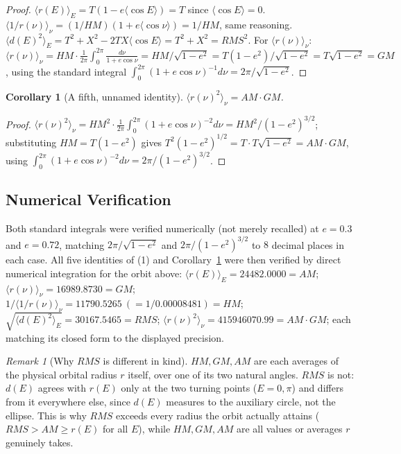 \documentclass[12pt]{amsart}
\theoremstyle{plain}
\newtheorem{corollary}[theorem]{Corollary}
\theoremstyle{remark}
\newtheorem*{remark}{Remark}
\begin{document}
\begin{proof}
$\langle r(E)\rangle_E=T(1-e\langle\cos E\rangle)=T$ since $\langle\cos E\rangle=0$. $\langle 1/r(\nu)\rangle_\nu=(1/HM)(1+e\langle\cos\nu\rangle)=1/HM$, same reasoning. $\langle d(E)^2\rangle_E=T^2+X^2-2TX\langle\cos E\rangle=T^2+X^2=RMS^2$. For $\langle r(\nu)\rangle_\nu$: $\langle r(\nu)\rangle_\nu=HM\cdot\tfrac1{2\pi}\int_0^{2\pi}\tfrac{d\nu}{1+e\cos\nu}=HM/\sqrt{1-e^2}=T(1-e^2)/\sqrt{1-e^2}=T\sqrt{1-e^2}=GM$, using the standard integral $\int_0^{2\pi}(1+e\cos\nu)^{-1}d\nu=2\pi/\sqrt{1-e^2}$.
\end{proof}

\begin{corollary}[A fifth, unnamed identity]\label{cor:AMGM}
$\langle r(\nu)^2\rangle_\nu=AM\cdot GM$.
\end{corollary}

\begin{proof}
$\langle r(\nu)^2\rangle_\nu=HM^2\cdot\tfrac1{2\pi}\int_0^{2\pi}(1+e\cos\nu)^{-2}d\nu=HM^2/(1-e^2)^{3/2}$; substituting $HM=T(1-e^2)$ gives $T^2(1-e^2)^{1/2}=T\cdot T\sqrt{1-e^2}=AM\cdot GM$, using $\int_0^{2\pi}(1+e\cos\nu)^{-2}d\nu=2\pi/(1-e^2)^{3/2}$.
\end{proof}

\subsection*{Numerical Verification}
Both standard integrals were verified numerically (not merely recalled) at $e=0.3$ and $e=0.72$, matching $2\pi/\sqrt{1-e^2}$ and $2\pi/(1-e^2)^{3/2}$ to $8$ decimal places in each case. All five identities of (1) and Corollary~\ref{cor:AMGM} were then verified by direct numerical integration for the orbit above: $\langle r(E)\rangle_E=24482.0000=AM$; $\langle r(\nu)\rangle_\nu=16989.8730=GM$; $1/\langle1/r(\nu)\rangle_\nu=11790.5265\ (=1/0.00008481)=HM$; $\sqrt{\langle d(E)^2\rangle_E}=30167.5465=RMS$; $\langle r(\nu)^2\rangle_\nu=415946070.99=AM\cdot GM$; each matching its closed form to the displayed precision.

\begin{remark}[Why $RMS$ is different in kind]
$HM,GM,AM$ are each averages of the physical orbital radius $r$ itself, over one of its two natural angles. $RMS$ is not: $d(E)$ agrees with $r(E)$ only at the two turning points ($E=0,\pi$) and differs from it everywhere else, since $d(E)$ measures to the auxiliary circle, not the ellipse. This is why $RMS$ exceeds every radius the orbit actually attains ($RMS>AM\ge r(E)$ for all $E$), while $HM,GM,AM$ are all values or averages $r$ genuinely takes.
\end{remark}
\end{document}
